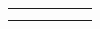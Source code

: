 {{\begin{center}
\begin{xtabular}[t]{|l|l|l|l|l|l|}
    
         &
    
    
         &
    
    
     \tabularnewline{}
    
    
         &
    
    
         &
    
    
         &
    
    
         &
    
    
         &
    
    
     \tabularnewline{}
    

\end{xtabular}
\end{center}}}
